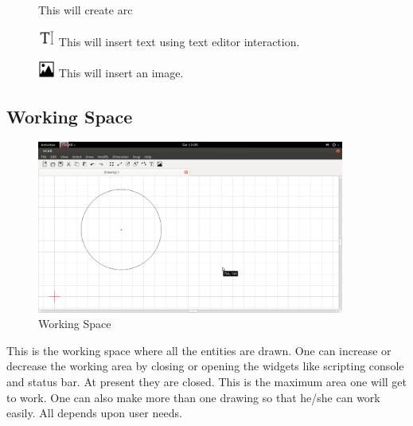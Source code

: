 \begin{enumerate}
\begin{figure}[h!]
This will create arc
\end{figure}
\begin{figure}[h!]
\includegraphics[width=0.05\textwidth]{images/text.jpg} 
This will insert text using text editor interaction.
\end{figure}
\begin{figure}[h!]
\includegraphics[width=0.05\textwidth]{images/image.jpg} 
This will insert an image.
\end{figure}
\end{enumerate}
\vspace{30em}
\subsection{Working Space}
\begin{figure}[h!]
\centering
\includegraphics[width=0.9\textwidth]{images/drawingarea.png} 
\caption{Working Space}
\end{figure}
This is the working space where all the entities are drawn. One can increase or decrease the working area by closing or opening the widgets like scripting console and status bar. At present they are closed. This is the maximum area one will get to work. One can also make more than one drawing so that he/she can work easily. All depends upon user needs.
